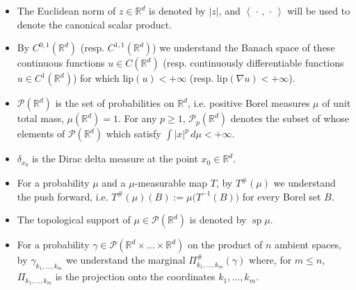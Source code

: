 \documentclass[11pt,reqno]{amsart}
\theoremstyle{definition}
\numberwithin{equation}{section}
\newcommand{\R}{\mathbb{R}}
\newcommand{\Rd}{{\R^d}}
\newcommand{\argu}{{\,\cdot\,}}
\newcommand{\Mes}{{\mathcal{M}}}
\newcommand{\PP}{\mathcal{P}}
\newcommand{\pairing}[1]{{\left \langle #1 \right \rangle}}
\newcommand{\Lip}{{\mathrm{lip}}}
\DeclareMathOperator{\spt}{sp}
\begin{document}
\begin{itemize}[leftmargin=1.2\parindent]
\item  The Euclidean norm of $z\in\R^d$ is denoted by $|z|$, and  $\pairing{\argu,\argu}$ will be used to denote the canonical scalar product.





\item  By $C^{0,1}(\Rd)$ (resp. $C^{1,1}(\Rd)$) we understand the Banach space of these continuous functions $u \in C(\Rd)$  (resp. continuously differentiable functions  $u\in C^1(\Rd)$) for which $\Lip(u)<+\infty$ (resp. $\Lip(\nabla u) <+\infty$).





  






 \item  $\PP(\Rd)$ is the set of probabilities on $\Rd$, i.e. positive Borel measures $\mu$ of unit total mass, $\mu(\Rd) = 1$.  For any $p\ge 1$, $\PP_p(\Rd)$ denotes the subset of whose elements of $\PP(\Rd)$
 which satisfy $\int |x|^p\, d\mu <+\infty$.
 \item  $\delta_{x_0}$ is the Dirac delta measure at the point  $x_0 \in \Rd$.
 
 \item For a probability $\mu$ and a $\mu$-measurable map $T$, by  $T^\#(\mu)$ we understand the push forward, i.e.  $T^\#(\mu)(B) := \mu\big( T^{-1}(B) \big)$ for every Borel set $B$.
 
 
  \item The topological support of $\mu \in \PP(\Rd)$ is denoted  by $\spt\mu$.

\item For a probability  $\gamma \in \PP(\Rd \times \ldots \times \Rd)$ on the product of $n$ ambient spaces, by $\gamma_{k_1,\ldots,k_m}$ we understand the marginal $\Pi_{k_1,\ldots,k_m}^\#(\gamma)$ where, for $m\leq n$,  $\Pi_{k_1,\ldots,k_m}$ is the projection onto the coordinates ${k_1,\ldots,k_m}$.


\end{itemize}
\end{document}
